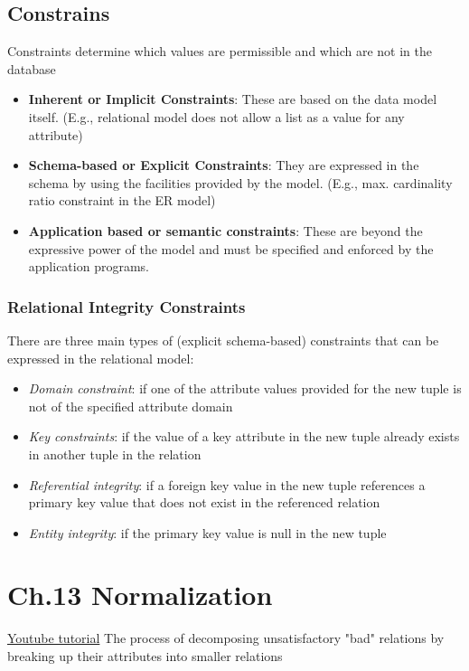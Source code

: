 \documentclass{article}
\begin{document}
\subsection{Constrains}
Constraints determine which values are permissible and 
which are not in the database
\begin{itemize}
    \item \textbf{Inherent or Implicit Constraints}: These are based on the data model itself. (E.g., relational model does not allow a list as a value for any attribute)
    \item \textbf{Schema-based or Explicit Constraints}: They are expressed in the schema by using the facilities provided by the model. (E.g., max. cardinality ratio constraint in the ER model) 
    \item \textbf{Application based or semantic constraints}: These are beyond the expressive power of the model and must be specified and enforced by the application programs. 
\end{itemize}

\subsubsection{Relational Integrity Constraints}
There are three main types of (explicit schema-based) 
constraints that can be expressed in the relational model:
\begin{itemize}
    \item \textit{Domain constraint}: \newline if one of the attribute values provided for the new tuple is not of the specified attribute domain
    \item \textit{Key constraints}: \newline if the value of a key attribute in the new tuple already exists in another tuple in the relation
    \item \textit{Referential integrity}: \newline if a foreign key value in the new tuple references a primary key value that does not exist in the referenced relation
    \item \textit{Entity integrity}: \newline if the primary key value is null in the new tuple
\end{itemize}

\newpage
\section{Ch.13 Normalization}
\href{https://www.youtube.com/watch?v=xoTyrdT9SZI}{Youtube tutorial}
The process of decomposing unsatisfactory "bad"
relations by breaking up their attributes into
smaller relations
\end{document}
